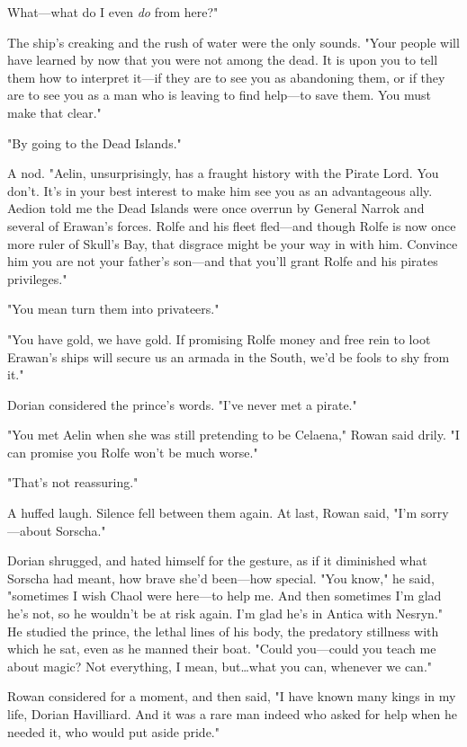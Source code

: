 What---what do I even \emph{do} from here?"

The ship's creaking and the rush of water were the only sounds.
"Your people will have learned by now that you were not among the dead.
It is upon you to tell them how to interpret it---if they are to see you as abandoning them, or if they are to see you as a man who is leaving to find help---to save them.
You must make that clear."

"By going to the Dead Islands."

A nod.
"Aelin, unsurprisingly, has a fraught history with the Pirate Lord.
You don't.
It's in your best interest to make him see you as an advantageous ally.
Aedion told me the Dead Islands were once overrun by General Narrok and several of Erawan's forces.
Rolfe and his fleet fled---and though Rolfe is now once more ruler of Skull's Bay, that disgrace might be your way in with him.
Convince him you are not your father's son---and that you'll grant Rolfe and his pirates privileges."

"You mean turn them into privateers."

"You have gold, we have gold.
If promising Rolfe money and free rein to loot Erawan's ships will secure us an armada in the South, we'd be fools to shy from it."

Dorian considered the prince's words.
"I've never met a pirate."

"You met Aelin when she was still pretending to be Celaena," Rowan said drily.
"I can promise you Rolfe won't be much worse."

"That's not reassuring."

A huffed laugh.
Silence fell between them again.
At last, Rowan said, "I'm sorry---about Sorscha."

Dorian shrugged, and hated himself for the gesture, as if it diminished what Sorscha had meant, how brave she'd been---how special.
"You know," he said, "sometimes I wish Chaol were here---to help me.
And then sometimes I'm glad he's not, so he wouldn't be at risk again.
I'm glad he's in Antica with Nesryn."
He studied the prince, the lethal lines of his body, the predatory stillness with which he sat, even as he manned their boat.
"Could you---could you teach me about magic?
Not everything, I mean, but\ldots what you can, whenever we can."

Rowan considered for a moment, and then said, "I have known many kings in my life, Dorian Havilliard.
And it was a rare man indeed who asked for help when he needed it, who would put aside pride."

